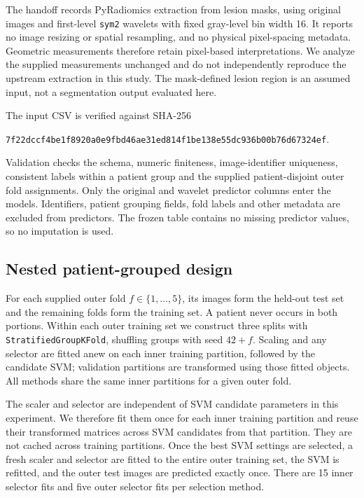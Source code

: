 \documentclass[11pt,a4paper]{article}
\begin{document}
The handoff records PyRadiomics extraction from lesion masks, using original images and first-level \texttt{sym2} wavelets with fixed gray-level bin width 16. It reports no image resizing or spatial resampling, and no physical pixel-spacing metadata. Geometric measurements therefore retain pixel-based interpretations. We analyze the supplied measurements unchanged and do not independently reproduce the upstream extraction in this study. The mask-defined lesion region is an assumed input, not a segmentation output evaluated here.

The input CSV is verified against SHA-256
\begin{center}\small\texttt{7f22dccf4be1f8920a0e9fbd46ae31ed814f1be138e55dc936b00b76d67324ef}.\end{center}
Validation checks the schema, numeric finiteness, image-identifier uniqueness, consistent labels within a patient group and the supplied patient-disjoint outer fold assignments. Only the original and wavelet predictor columns enter the models. Identifiers, patient grouping fields, fold labels and other metadata are excluded from predictors. The frozen table contains no missing predictor values, so no imputation is used.

\subsection{Nested patient-grouped design}
For each supplied outer fold $f\in\{1,\ldots,5\}$, its images form the held-out test set and the remaining folds form the training set. A patient never occurs in both portions. Within each outer training set we construct three splits with \texttt{StratifiedGroupKFold}, shuffling groups with seed $42+f$. Scaling and any selector are fitted anew on each inner training partition, followed by the candidate SVM; validation partitions are transformed using those fitted objects. All methods share the same inner partitions for a given outer fold.

The scaler and selector are independent of SVM candidate parameters in this experiment. We therefore fit them once for each inner training partition and reuse their transformed matrices across SVM candidates from that partition. They are not cached across training partitions. Once the best SVM settings are selected, a fresh scaler and selector are fitted to the entire outer training set, the SVM is refitted, and the outer test images are predicted exactly once. There are 15 inner selector fits and five outer selector fits per selection method.
\end{document}
